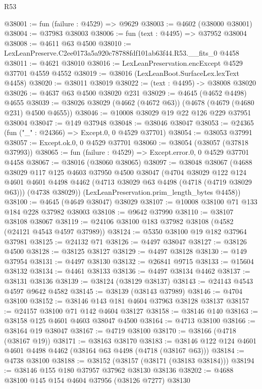 \begin{lexlean}{R53}
\begin{coremodule}
@38001 := fun (failure : @4529) => @9629
@38003 := @4602 (@38000 @38001)
@38004 := @37983 @38003
@38006 := fun (text : @4495) => @37952 @38004
@38008 := @4611 @63 @4500
@38010 := LexLeanPreserve.C2ee0173a5a920c78788fdf101ab63f44.R53.__fits_0 @4458
@38011 := @4621 @38010
@38016 := LexLeanPreservation.encExcept @4529 @37701 @4559 @4552
@38019 := @38016 (LexLeanBoot.SurfaceLex.lexText @4458)
@38020 := @38011 @38019
@38022 := (text : @4495) -> @38008 @38020
@38026 := @4637 @63 @4500 @38020 @231
@38029 := @4645 (@4652 @4498) @4655
@38039 := @38026 @38029 (@4662 (@4672 @63)) (@4678 (@4679 (@4680 @231) @4500 @4655))
@38046 := @10008 @38029 @19 @22 @126 @229 @37951 @38004
@38047 := @149 @37948
@38048 := @38046 @38047
@38053 := @24365 (fun ("_" : @24366) => Except.{0, 0} @4529 @37701)
@38054 := @38053 @37991
@38057 := Except.ok.{0, 0} @4529 @37701
@38060 := @38054 (@38057 (@37818 @37993))
@38065 := fun (failure : @4529) => Except.error.{0, 0} @4529 @37701 @4458
@38067 := @38016 (@38060 @38065)
@38097 := @38048
    @38067
    (@4688
      @38029
      @117
      @125
      @4603
      @37950
      @4500
      @38047
      (@4704
        @38029
        @122
        @124
        @4601
        @4601
        @4498
        @4462
        (@4713 @38029 @63 @4498 (@4718 (@4719 @38029 @63)))
        (@4738 @38029))
      (LexLeanPreservation.prim_length_bytes @4458))
@38100 := @4645 (@4649 @38047) @38029
@38107 := @10008 @38100 @71 @133 @184 @228 @37982 @38003
@38108 := @9642 @37990
@38110 := @38107 @38108 @38067
@38119 := @24106 @38100 @183 @37982 @38108 (@4582 (@24121 @4543 @4597 @37989))
@38124 := @5350 @38100 @19 @182 @37964 @37981
@38125 := @24132 @71
@38126 := @4497 @38047
@38127 := @38126 @4500
@38128 := @38125 @38127
@38129 := @4497 @38128
@38130 := @149 @37954
@38131 := @4497 @38130
@38132 := @26841 @9715
@38133 := @15604 @38132
@38134 := @4461 @38133
@38136 := @4497 @38134 @4462
@38137 := @38131 @38136
@38139 := @38124 (@38129 @38137)
@38143 := @24143 @4543 @4597 @9642 @4582
@38145 := @38139 (@38143 @37989)
@38146 := @4704 @38100
@38152 := @38146 @143 @181 @4604 @37963 @38128 @38137
@38157 := @24157 @38100 @71 @142 @4604 @38127
@38158 := @38146 @140
@38163 := @38158 @125 @4601 @4603 @38047 @4500
@38164 := @4713 @38100
@38166 := @38164 @19 @38047
@38167 := @4719 @38100
@38170 := @38166 (@4718 (@38167 @19))
@38171 := @38163 @38170
@38183 := @38146 @122 @124 @4601 @4601 @4498 @4462 (@38164 @63 @4498 (@4718 (@38167 @63)))
@38184 := @4738 @38100
@38188 := @38152 (@38157 (@38171 (@38183 @38184)))
@38194 := @38146 @155 @180 @37957 @37962 @38130 @38136
@38202 := @4688 @38100 @145 @154 @4604 @37956 (@38126 @7277) @38130

\end{coremodule}
\end{lexlean}
